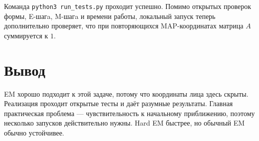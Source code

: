 \documentclass[12pt,a4paper]{article}
\begin{document}
Команда \texttt{python3 run\_tests.py} проходит успешно. Помимо открытых проверок формы, E-шагa, M-шагa и времени работы, локальный запуск теперь дополнительно проверяет, что при повторяющихся MAP-координатах матрица $A$ суммируется к $1$.

\section{Вывод}

EM хорошо подходит к этой задаче, потому что координаты лица здесь скрыты. Реализация проходит открытые тесты и даёт разумные результаты. Главная практическая проблема --- чувствительность к начальному приближению, поэтому несколько запусков действительно нужны. Hard EM быстрее, но обычный EM обычно устойчивее.
\end{document}
